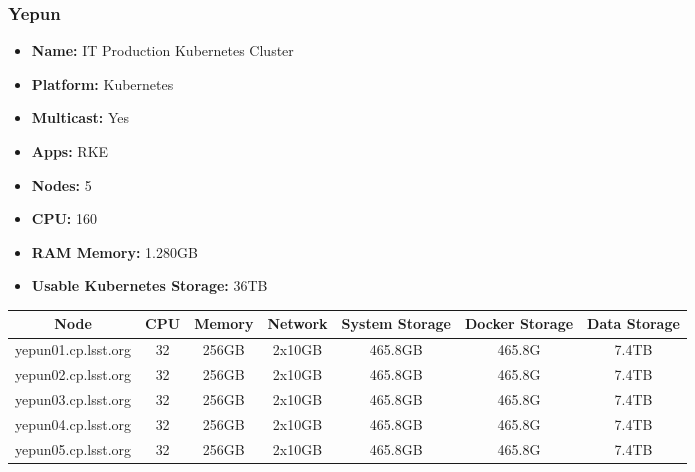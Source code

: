 \newpage
\subsubsection{Yepun}
\begin{itemize}
  \itemsep0em 
  \item \textbf{Name:}       IT Production Kubernetes Cluster
  \item \textbf{Platform:}   Kubernetes
  \item \textbf{Multicast:}  Yes
  \item \textbf{Apps:}       RKE
  \item \textbf{Nodes:}      5
  \item \textbf{CPU:}        160
  \item \textbf{RAM Memory:} 1.280GB 
  \item \textbf{Usable Kubernetes Storage:} 36TB
\end{itemize}
\begin{center}
  \small
  \begin{tabular}{||c c c c c c c||} 
    \hline
    \textbf{Node} & \textbf{CPU} & \textbf{Memory} & \textbf{Network} & \textbf{System Storage} & \textbf{Docker Storage} & \textbf{Data Storage} \\ [0.5ex]
    \hline
    yepun01.cp.lsst.org & 32 & 256GB & 2x10GB & 465.8GB & 465.8G & 7.4TB \\
    \hline
    yepun02.cp.lsst.org & 32 & 256GB & 2x10GB & 465.8GB & 465.8G & 7.4TB \\
    \hline
    yepun03.cp.lsst.org & 32 & 256GB & 2x10GB & 465.8GB & 465.8G & 7.4TB \\
    \hline
    yepun04.cp.lsst.org & 32 & 256GB & 2x10GB & 465.8GB & 465.8G & 7.4TB \\
    \hline
    yepun05.cp.lsst.org & 32 & 256GB & 2x10GB & 465.8GB & 465.8G & 7.4TB \\
    \hline    
  \end{tabular}
\end{center}

\newpage
